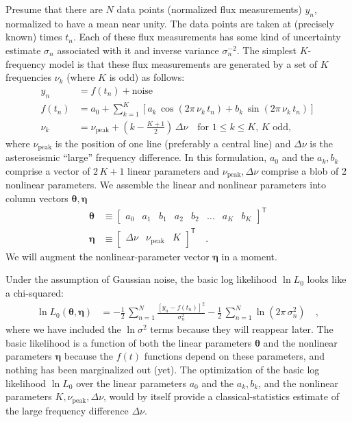 \documentclass[modern]{aastex63}
\newcommand{\nupeak}{\nu_\mathrm{peak}}
\newcommand{\T}{^{\!\mathsf{T}\!}}
\renewcommand{\vector}[1]{\boldsymbol{#1}}
\newcommand{\veta}{\vector{\eta}}
\newcommand{\vtheta}{\vector{\theta}}
\begin{document}
Presume that there are $N$ data points (normalized flux measurements)
$y_n$, normalized to have a mean near unity.
The data points are taken at (precisely known) times $t_n$.
Each of these flux measurements has some kind of uncertainty estimate
$\sigma_n$ associated with it and inverse variance $\sigma_n^{-2}$.
The simplest $K$-frequency model is that these flux measurements are
generated by a set of $K$ frequencies $\nu_k$ (where $K$ is odd) as follows:
\begin{align}
  y_n &= f(t_n) + \mbox{noise}
  \\
  f(t_n) &= a_0 + \sum_{k=1}^K \left[a_k\,\cos(2\pi\,\nu_k\,t_n) + b_k\,\sin(2\pi\,\nu_k\,t_n)\right]
  \\ \label{eq:nuk}
  \nu_k &= \nupeak + \left(k - \frac{K + 1}{2}\right)\,\Delta\nu
  \quad \mbox{for $1\leq k\leq K$, $K$ odd,}
\end{align}
where $\nupeak$ is the position of one line (preferably a central line)
and $\Delta\nu$ is the asteroseismic ``large'' frequency difference.
In this formulation, $a_0$ and the $a_k,b_k$ comprise a vector of
$2\,K+1$ linear parameters and $\nupeak, \Delta\nu$ comprise a
blob of 2 nonlinear parameters.
We assemble the linear and nonlinear parameters into column vectors $\vtheta,\veta$
\begin{align}
  \vtheta &\equiv \begin{bmatrix} a_0 & a_1 & b_1 & a_2 & b_2 & \hdots & a_K & b_K \end{bmatrix}\T
  \\
  \veta &\equiv \begin{bmatrix} \Delta\nu & \nupeak & K \end{bmatrix}\T
  \quad .
\end{align}
We will augment the nonlinear-parameter vector $\veta$ in a moment.

Under the assumption of Gaussian noise, the basic log likelihood $\ln L_0$ looks like a
chi-squared:
\begin{align}\label{eq:like}
  \ln L_0(\vtheta,\veta)
  &= -\frac{1}{2}\,\sum_{n=1}^N \frac{[y_n - f(t_n)]^2}{\sigma_n^2}
     -\frac{1}{2}\,\sum_{n=1}^N \ln(2\pi\,\sigma_n^2)
  \quad,
\end{align}
where we have included the $\ln\sigma^2$ terms because they will reappear later.
The basic likelihood is a function of both the linear parameters $\vtheta$ and
the nonlinear parameters $\veta$ because the $f(t)$ functions depend on these
parameters, and nothing has been marginalized out (yet).
The optimization of the basic log likelihood $\ln L_0$
over the linear parameters $a_0$ and the $a_k, b_k$, and the nonlinear
parameters $K, \nupeak, \Delta\nu$, would by itself provide a
classical-statistics estimate of the large frequency difference
$\Delta\nu$.
\end{document}
